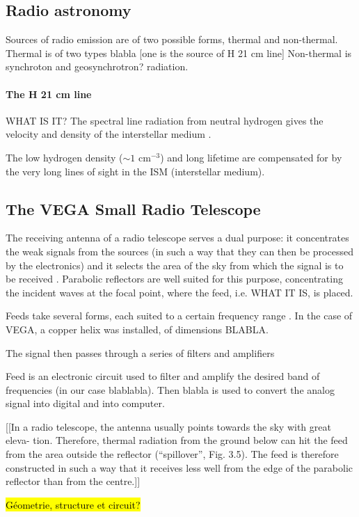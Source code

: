\subsection{Radio astronomy }
Sources of radio emission are of two possible forms, thermal and non-thermal.
Thermal is of two types blabla [one is the source of H 21 cm line]
Non-thermal is synchroton and geosynchrotron? radiation.

\paragraph{The H 21 cm line}
WHAT IS IT?
The spectral line radiation from neutral hydrogen gives the velocity and density of the interstellar medium \cite{burke_introduction_2013}.

The low hydrogen density ($\sim 1$ cm$^{-3}$) and long lifetime are compensated for by the very long lines of sight in the ISM (interstellar medium)\cite{burke_introduction_2013}.

\subsection{The VEGA Small Radio Telescope}

The receiving antenna of a radio telescope serves a dual purpose: it concentrates the weak signals from the sources (in such a way that they can then be processed by the electronics) and it selects the area of the sky from which the signal is to be received \cite{lauterbach_radio_2022}.
Parabolic reflectors are well suited for this purpose, concentrating the incident waves at the focal point, where the feed, i.e. WHAT IT IS, is placed.

Feeds take several forms, each suited to a certain frequency range \cite{lauterbach_radio_2022}. In the case of VEGA, a copper helix was installed, of dimensions BLABLA.

The signal then passes through a series of filters and amplifiers

Feed is an electronic circuit used to filter and amplify the desired band of frequencies (in our case blablabla).
Then blabla is used to convert the analog signal into digital and into computer.

[[In a radio telescope, the antenna usually points towards the sky with great eleva-
tion. Therefore, thermal radiation from the ground below can hit the feed from the
area outside the reflector (“spillover”, Fig. 3.5). The feed is therefore constructed
in such a way that it receives less well from the edge of the parabolic reflector than
from the centre.]]


\hl{Géometrie, structure et circuit?}
\cite{installation_manual_2022}
\cite{interdisciplinary_project_2022}